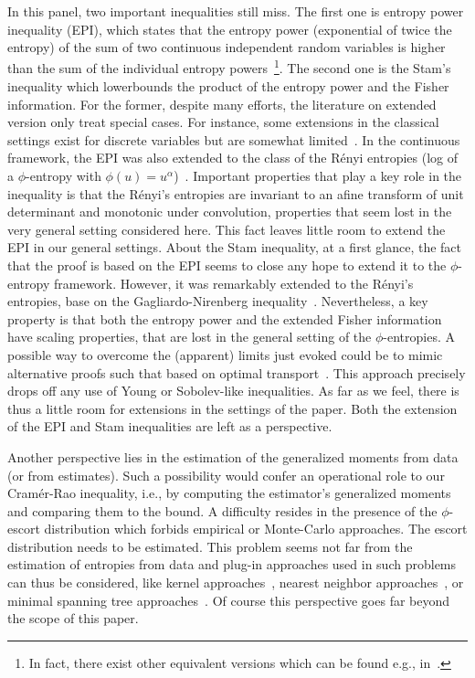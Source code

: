 \documentclass[entropy,article,submit,moreauthors,pdftex]{Definitions/mdpi}
\newcommand{\SZ}[1]{{\color{blue} #1}}
\begin{document}
\SZ{In  this panel,  two important  inequalities still  miss. The  first one  is
  entropy  power  inequality   (EPI),  which  states  that   the  entropy  power
  (exponential of  twice the entropy) of  the sum of two  continuous independent
  random  variables   is  higher  than   the  sum  of  the   individual  entropy
  powers~\footnote{\SZ{In fact, there exist  other equivalent versions which can
    be found e.g., in~\cite{CovTho06, DemCov91}.}}. The second one is the Stam's
  inequality which lowerbounds  the product of the entropy power  and the Fisher
  information. For the former, despite  many efforts, the literature on extended
  version  only treat  special  cases.   For instance,  some  extensions in  the
  classical   settings   exist  for   discrete   variables   but  are   somewhat
  limited~\cite{HarVig03, JohYu10,  HagAbb14}. In the continuous  framework, the
  EPI  was also  extended  to the  class  of  the R\'enyi  entropies  (log of  a
  $\phi$-entropy   with   $\phi(u)  =   u^\alpha$)~\cite{BobChi15}.    Important
  properties  that play  a key  role  in the  inequality is  that the  R\'enyi's
  entropies  are  invariant  to  an  afine transform  of  unit  determinant  and
  monotonic under  convolution, properties  that seem lost  in the  very general
  setting considered here. This fact leaves little room to extend the EPI in our
  general settings. About the Stam inequality,  at a first glance, the fact that
  the proof  is based on  the EPI seems  to close any hope  to extend it  to the
  $\phi$-entropy framework. However, it was remarkably extended to the R\'enyi's
  entropies,  base   on  the   Gagliardo-Nirenberg  inequality~\cite{Ber12:06_1,
    LutYan05, LutLv12, ZozPue17}. Nevertheless, a  key property is that both the
  entropy power  and the  extended Fisher  information have  scaling properties,
  that are lost  in the general setting of the  $\phi$-entropies. A possible way
  to overcome  the (apparent) limits just  evoked could be to  mimic alternative
  proofs  such  that based  on  optimal  transport~\cite{Rio17}.  This  approach
  precisely drops off  any use of Young or Sobolev-like  inequalities. As far as
  we feel,  there is thus a  little room for  extensions in the settings  of the
  paper. Both  the extension  of the  EPI and  Stam inequalities  are left  as a
  perspective.}

Another perspective lies in the estimation  of the generalized moments from data
(or from estimates). Such a possibility  would confer an operational role to our
Cram\'er-Rao inequality, i.e., by  computing the estimator's generalized moments
and comparing  them to the  bound. A difficulty resides  in the presence  of the
$\phi$-escort    distribution   which    forbids   empirical    or   Monte-Carlo
approaches. The escort  distribution needs to be estimated.   This problem seems
not far from  the estimation of entropies from data  and plug-in approaches used
in such  problems can  thus be  considered, like  kernel approaches~\cite{Ros56,
  Par62,  BeiDud97}, nearest  neighbor approaches~\cite{LeoPro08,  BeiDud97}, or
minimal spanning tree approaches~\cite{HerMa02}. Of course this perspective goes
far beyond the scope of this paper.
\end{document}
